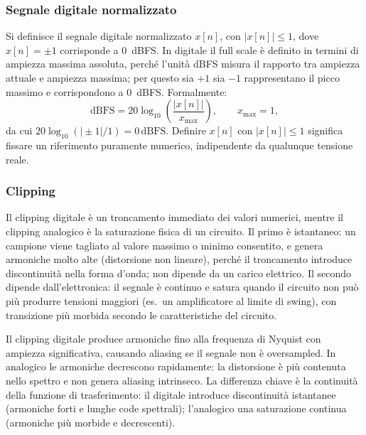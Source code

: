 \subsubsection{Segnale digitale normalizzato}\label{sec:segnaleDigitale}
Si definisce il segnale digitale normalizzato $x[n]$, con $|x[n]|\le1$,
dove $x[n]=\pm1$ corrisponde a \SI{0}{dBFS}. In digitale il full scale è
definito in termini di ampiezza massima assoluta, perché l'unità
\si{dBFS} misura il rapporto tra ampiezza attuale e ampiezza massima; per
questo sia $+1$ sia $-1$ rappresentano il picco massimo e corrispondono a
\SI{0}{dBFS}. Formalmente:
\begin{equation}
  \mathrm{dBFS}=20\log_{10}\!\left(\frac{|x[n]|}{x_{\max}}\right),
  \qquad x_{\max}=1,
\end{equation}
da cui $20\log_{10}(|\!\pm1|/1)=0\,\mathrm{dBFS}$. Definire $x[n]$ con
$|x[n]|\le1$ significa fissare un riferimento puramente numerico,
indipendente da qualunque tensione reale.

\subsubsection{Clipping}\label{sec:clipping}
Il clipping digitale è un troncamento immediato dei valori numerici,
mentre il clipping analogico è la saturazione fisica di un circuito. Il
primo è istantaneo: un campione viene tagliato al valore massimo o minimo
consentito, e genera armoniche molto alte (distorsione non lineare),
perché il troncamento introduce discontinuità nella forma d'onda; non
dipende da un carico elettrico. Il secondo dipende dall'elettronica: il
segnale è continuo e satura quando il circuito non può più produrre
tensioni maggiori (es.\ un amplificatore al limite di swing), con
transizione più morbida secondo le caratteristiche del circuito.

Il clipping digitale produce armoniche fino alla frequenza di Nyquist con
ampiezza significativa, causando aliasing se il segnale non è
oversampled. In analogico le armoniche decrescono rapidamente: la
distorsione è più contenuta nello spettro e non genera aliasing
intrinseco. La differenza chiave è la continuità della funzione di
trasferimento: il digitale introduce discontinuità istantanee (armoniche
forti e lunghe code spettrali); l'analogico una saturazione continua
(armoniche più morbide e decrescenti).

